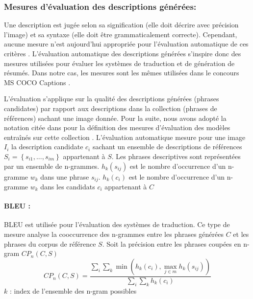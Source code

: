 \subsubsection{Mesures d'évaluation des descriptions générées:}

Une description est jugée selon sa signification (elle doit décrire avec précision l'image) et sa syntaxe (elle doit être grammaticalement correcte). Cependant, aucune mesure n'est aujourd'hui appropriée pour l'évaluation automatique de ces critères \cite{young2014image} \cite{ordonez2011im2text}. L'évaluation automatique des descriptions générées s'inspire donc des mesures utilisées pour évaluer les systèmes de traduction et de génération de résumés. Dans notre cas, les mesures sont les mêmes utilisées dans le concours MS COCO Captions \cite{chen2015microsoft}.
\smallskip

L'évaluation s'applique sur la qualité des descriptions générées (phrases candidates) par rapport aux descriptions dans la collection (phrases de références) sachant une image donnée.
Pour la suite, nous avons adopté la notation citée dans \cite{chen2015microsoft} pour la définition des mesures d'évaluation des modèles entraînés sur cette collection \cite{mao2014deep} \cite{mao2015learning} \cite{fang2015captions} \cite{xu2015show} \cite{karpathy2015deep} \cite{donahue2015long}. L'évaluation automatique mesure pour une image $I_{i}$ la description candidate $c_{i}$ sachant un ensemble de descriptions de références $S_{i} = \left \{ s_{i1},..., s_{im} \right \}$ appartenant à $S$.
Les phrases descriptives sont représentées par un ensemble de n-grammes.
$h_{k}(s_{ij})$ est le nombre d'occurrence d'un n-gramme $w_{k}$ dans une phrase $s_{ij}$.
$h_{k}(c_{i})$   est le nombre d'occurrence d'un n-gramme $w_{k}$ dans les candidats $c_{i}$ appartenant à $C$

\paragraph{BLEU \cite{papineni2002bleu}:} 
BLEU est utilisée pour l'évaluation des systèmes de traduction. Ce type de mesure analyse la cooccurrence des n-grammes entre les phrases générées $C$ et les phrases du corpus de référence $S$.
Soit la précision entre les phrases coupées en n-gram $CP_{n}(C,S)$
\begin{equation}
CP_{n}(C,S)=\frac{\sum_{i}\sum_{k} \min(h_{k}(c_{i}),\underset{j\in m}{\max}h_{k}(s_{ij}))}{\sum_{i}\sum_{k} h_{k}(c_{i})}
\end{equation}
$k$ : index de l'ensemble des n-gram possibles

